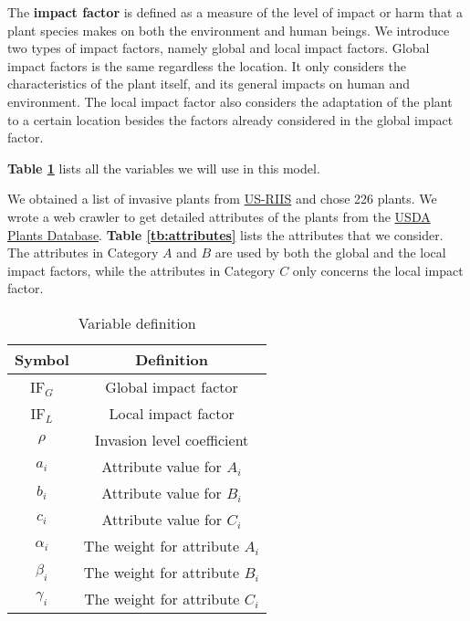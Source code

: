 \documentclass[12pt]{article}
\begin{document}
		The \textbf{impact factor} is defined as a measure of the level of impact or harm that a plant species makes on both the environment and human beings.  We introduce two types of impact factors, namely global and local impact factors.  Global impact factors is the same regardless the location.  It only considers the characteristics of the plant itself, and its general impacts on human and environment.  The local impact factor also considers the adaptation of the plant to a certain location besides the factors already considered in the global impact factor.  
		
		\textbf{Table \ref{tb:syms}} lists all the variables we will use in this model.
		
		We obtained a list of invasive plants from \href{https://www.sciencebase.gov/catalog/item/5b911a5ce4b0702d0e808588}{US-RIIS}\autocite{US-RIIS} and chose 226 plants.  We wrote a web crawler to get detailed attributes of the plants from the \href{https://plants.usda.gov/home/}{USDA Plants Database}\autocite{USDA}.  \textbf{Table \ref{tb:attributes}} lists the attributes that we consider.  The attributes in Category $A$ and $B$ are used by both the global and the local impact factors, while the attributes in Category $C$ only concerns the local impact factor.
		
		{
			\fontsize{10}{14}\selectfont
			{
				\begin{longtable}{cc}
					
					\caption{Variable definition}
					\label{tb:syms}\\
					\toprule
					Symbol&Definition\\
					\toprule
					IF$_G$&Global impact factor\\
					IF$_L$&Local impact factor\\
					$\rho$&Invasion level coefficient\\
					$a_i$&Attribute value for $A_i$\\
					$b_i$&Attribute value for $B_i$\\
					$c_i$&Attribute value for $C_i$\\
					$\alpha_i$&The weight for attribute $A_i$\\
					$\beta_i$&The weight for attribute $B_i$\\
					$\gamma_i$&The weight for attribute $C_i$\\
					\bottomrule
					
				\end{longtable}
			}
		}
		
\end{document}
